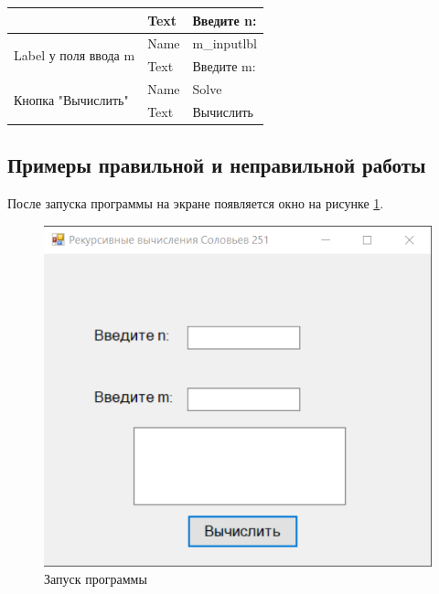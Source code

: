 \begin{table}[H]
\begin{tabular}{|l|l|l|}
                                                                            & Text                                                                           & Введите n:                                                                    \\ \hline
\multirow{2}{*}{Label у поля ввода m}                                       & Name                                                                           & m\_inputlbl                                                                   \\ \cline{2-3} 
                                                                            & Text                                                                           & Введите m:                                                                    \\ \hline
\multirow{2}{*}{Кнопка "Вычислить"}                                         & Name                                                                           & Solve                                                                         \\ \cline{2-3} 
                                                                            & Text                                                                           & Вычислить                                                                     \\ \hline
\end{tabular}

\label{task3_attributes}
\end{table}


\subsection{Примеры правильной и неправильной работы}
После запуска программы на экране появляется окно на рисунке \ref{task3_launch1}.
\begin{figure}[H]
    \centering
    \includegraphics[width=0.6\linewidth]{lections/img/task3_launch1.png}
    \caption{Запуск программы}
    \label{task3_launch1}
\end{figure}

